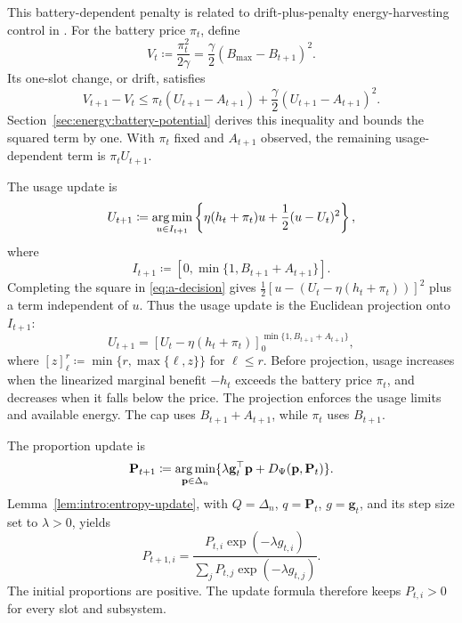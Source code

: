 This battery-dependent penalty is related to drift-plus-penalty
energy-harvesting control in
\cite[Section~III-B and Lemma~3]{Yu2019}.
For the battery price $\pi_t$, define
\begin{equation}\label{eq:energy:price-potential}
V_t\coloneqq\frac{\pi_t^2}{2\gamma}
   =\frac{\gamma}{2}(B_{\mathrm{max}}-B_{t+1})^2.
\end{equation}
Its one-slot change, or drift, satisfies
\[
V_{t+1}-V_t
\leq\pi_t(U_{t+1}-A_{t+1})
    +\frac{\gamma}{2}(U_{t+1}-A_{t+1})^2.
\]
Section~\ref{sec:energy:battery-potential} derives this inequality and
bounds the squared term by one. With $\pi_t$ fixed and $A_{t+1}$ observed,
the remaining usage-dependent term is $\pi_tU_{t+1}$.

The usage update is
\begin{equation}\label{eq:a-decision}
U_{t+1}\coloneqq\operatorname*{arg\,min}_{u\in I_{t+1}}
\left\{\eta(h_t+\pi_t)u+\frac12(u-U_t)^2\right\},
\end{equation}
where
\[
I_{t+1}\coloneqq[0,\min\{1,B_{t+1}+A_{t+1}\}].
\]
Completing the square in \eqref{eq:a-decision} gives
$\tfrac12[u-(U_t-\eta(h_t+\pi_t))]^2$ plus a term independent of $u$.
Thus the usage update is the Euclidean projection onto $I_{t+1}$:
\begin{equation}\label{Update A}
U_{t+1}=[U_t-\eta(h_t+\pi_t)]
 _{0}^{\min\{1,B_{t+1}+A_{t+1}\}},
\end{equation}
where $[z]_\ell^r\coloneqq\min\{r,\max\{\ell,z\}\}$ for $\ell\leq r$.
Before projection, usage increases when the linearized marginal benefit
$-h_t$ exceeds the battery price $\pi_t$, and decreases when it falls below
the price. The projection enforces the usage limits and available energy.
The cap uses $B_{t+1}+A_{t+1}$, while $\pi_t$ uses $B_{t+1}$.

The proportion update is
\begin{equation}\label{eq:p-decision}
\mathbf P_{t+1}\coloneqq\operatorname*{arg\,min}_{\mathbf p\in\Delta_n}
\{\lambda\mathbf g_t^\top\mathbf p+D_\Psi(\mathbf p,\mathbf P_t)\}.
\end{equation}
Lemma~\ref{lem:intro:entropy-update}, with $Q=\Delta_n$,
$q=\mathbf P_t$, $g=\mathbf g_t$, and its step size set to $\lambda>0$, yields
\begin{equation}\label{eq:p-decision-observe}
P_{t+1,i}
=\frac{P_{t,i}\exp(-\lambda g_{t,i})}
       {\sum_jP_{t,j}\exp(-\lambda g_{t,j})}.
\end{equation}
The initial proportions are positive.
The update formula therefore keeps $P_{t,i}>0$ for every slot and subsystem.

